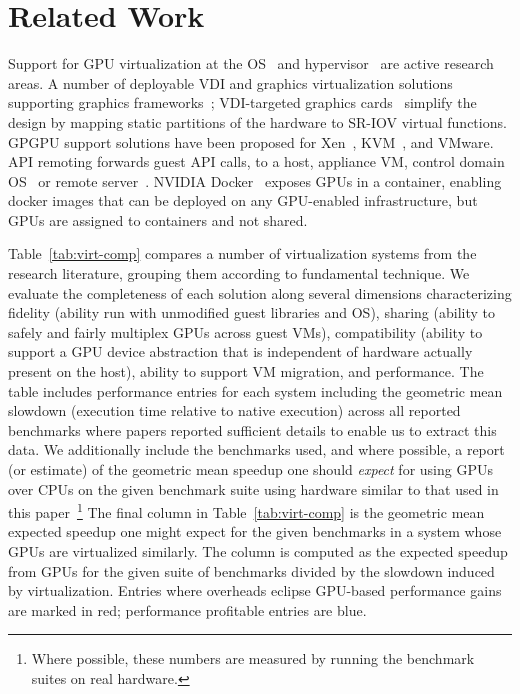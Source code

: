 
\section{Related Work}
\label{s:related}




Support for GPU virtualization at the
OS~\cite{kato2011timegraph,kato2012gdev,rossbach2011ptask,
  silberstein2013gpufs,gpunet,rossbach11hotos,neon,rinnegan} and
hypervisor~\cite{rossbach16vee, kaveri16vee} are active research
areas.  A number of deployable VDI and graphics virtualization
solutions~\cite{vmware-virtual-gpu, VGML} supporting graphics
frameworks~\cite{directX,openGLspec,mark03cg}; VDI-targeted graphics
cards~\cite{grid, firepro} simplify the design by mapping static
partitions of the hardware to SR-IOV virtual functions.  GPGPU support
solutions have been proposed for
Xen~\cite{tian2014full,gupta2009gvim,suzuki2014gpuvm,shi2012vcuda,xen},
KVM~\cite{huang2016building}, and VMware\cite{dowty2009gpu}.  API
remoting forwards guest API calls, to a host, appliance VM, control
domain OS~\cite{gupta2009gvim, vCUDA, gVirtuS,vmCUDA} or remote
server~\cite{rCUDA,
  rCUDAnew,GridCuda,VCL,giunta2010gpgpu,montella2012general}.  NVIDIA
Docker~\cite{nvidia_container} exposes GPUs in a container, enabling
docker images that can be deployed on any GPU-enabled infrastructure,
but GPUs are assigned to containers and not shared.

Table~\ref{tab:virt-comp} compares a number of virtualization systems
from the research literature, grouping them according to fundamental
technique.
We evaluate the completeness of each solution along several dimensions characterizing
fidelity (ability run with unmodified guest libraries and OS), sharing (ability to safely and
fairly multiplex GPUs across guest VMs), compatibility (ability to support a GPU device abstraction
that is independent of hardware actually present on the host), ability to support VM migration,
and performance.
The table includes performance entries for each system including the geometric
mean slowdown (execution time relative to native execution) across all reported benchmarks
where papers reported sufficient details to enable us to extract this data.
We additionally include the benchmarks used, and where possible,
a report (or estimate) of the geometric mean speedup one should \emph{expect} for using GPUs over CPUs
on the given benchmark suite using hardware similar to that used in this paper~\footnote{Where possible, these
numbers are measured by running the benchmark suites on real hardware.}
The final column in Table~\ref{tab:virt-comp} is the geometric mean expected
speedup one might expect for the given benchmarks in a system whose GPUs are virtualized similarly.
The column is computed as the expected speedup from GPUs for the given suite of benchmarks divided
by the slowdown induced by virtualization. Entries where overheads eclipse GPU-based performance
gains are marked in red; performance profitable entries are blue.

